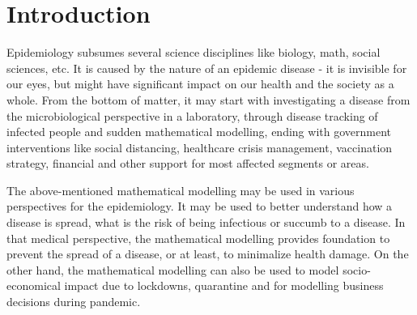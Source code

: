 \documentclass[
  digital, %
  oneside, %
  lof,     %
  lot,     %
]{fithesis4}
\begin{document}

\chapter*{Introduction}

Epidemiology subsumes several science disciplines like biology, 
math, social sciences, etc. 
It is caused by the nature of an epidemic disease - it is 
invisible for our eyes, but might have significant impact on 
our health and the society as a whole.
From the bottom of matter, it may start with investigating a 
disease from the microbiological perspective in a laboratory, 
through disease tracking of infected people and sudden mathematical
modelling, ending  with government interventions like social distancing, 
healthcare crisis management, vaccination strategy, financial and other 
support for most affected segments or areas.

The above-mentioned mathematical modelling may be used in 
various perspectives for the epidemiology. It may be used to
better understand how a disease is spread, what is the risk 
of being infectious or succumb to a disease. In that medical 
perspective, the mathematical modelling provides foundation to 
prevent the spread of a disease, or at least, to minimalize health damage.
On the other hand, the mathematical modelling can also be used to model
socio-economical impact due to lockdowns, quarantine 
and for modelling business decisions during pandemic.
\end{document}

